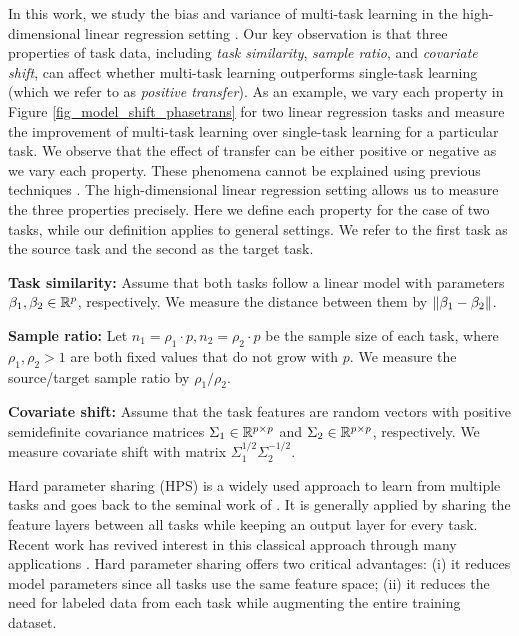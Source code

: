 In this work, we study the bias and variance of multi-task learning in the high-dimensional linear regression setting \cite{HMRT19,BLLT20}.
Our key observation is that three properties of task data, including \textit{task similarity}, \textit{sample ratio}, and \textit{covariate shift}, can affect whether multi-task learning outperforms single-task learning (which we refer to as \textit{positive transfer}).
As an example, we vary each property in Figure \ref{fig_model_shift_phasetrans} for two linear regression tasks and measure the improvement of multi-task learning over single-task learning for a particular task.
We observe that the effect of transfer can be either positive or negative as we vary each property.
These phenomena cannot be explained using previous techniques \cite{WZR20}.
The high-dimensional linear regression setting allows us to measure the three properties precisely.
Here we define each property for the case of two tasks, while our definition applies to general settings.
We refer to the first task as the source task and the second as the target task.
\squishlist
	\item \textbf{Task similarity:} Assume that both tasks follow a linear model with parameters $\beta_1, \beta_2\in\mathbb{R}^p$, respectively.
	We measure the distance between them by $\|\beta_1 - \beta_2\|$.
	\item \textbf{Sample ratio:} Let $n_1 = \rho_1 \cdot p, n_2 = \rho_2 \cdot p$ be the sample size of each task, where $\rho_1, \rho_2>1$ are both fixed values that do not grow with $p$.
	We measure the source/target sample ratio by $\rho_1 / \rho_2$.
	\item \textbf{Covariate shift:} Assume that the task features are random vectors with positive semidefinite covariance matrices $\Sigma_1\in\mathbb{R}^{p\times p}$ and $\Sigma_2\in\mathbb{R}^{p\times p}$, respectively.
	We measure covariate shift with matrix $\Sigma_1^{1/2}\Sigma_2^{-1/2}$.
\squishend
\fi


Hard parameter sharing (HPS) is a widely used approach to learn from multiple tasks and goes back to the seminal work of \citet{C97}.
It is generally applied by sharing the feature layers between all tasks while keeping an output layer for every task.
Recent work has revived interest in this classical approach through many applications \cite{MTDNN19,ZSSGM18}.
Hard parameter sharing offers two critical advantages:
(i) it reduces model parameters since all tasks use the same feature space;
(ii) it reduces the need for labeled data from each task while augmenting the entire training dataset.

